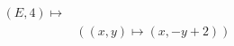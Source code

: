 \documentclass[preview]{standalone}
\begin{document}
\begin{align*}
(E,4) \mapsto &\\&( (x,y) \mapsto (x, -y + 2))
\end{align*}
\end{document}
